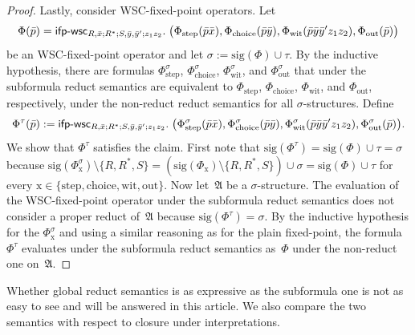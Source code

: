 \documentclass[]{lmcs}
\newcommand{\qspace}{\mathchoice{\;}{\,}{}{}}
\newcommand{\set}[1]{\lbrace #1 \rbrace}
\newcommand{\formA}{\Phi}
\newcommand{\tup}[1]{\bar{#1}}
\newcommand{\StructA}{\mathfrak{A}}
\newcommand{\sigA}{\tau}
\newcommand{\sigB}{\sigma}
\newcommand{\sigOf}[1]{\mathrm{sig}(#1)}
\newcommand{\formOut}{\formA_{\text{out}}}
\newcommand{\formStep}{\formA_{\text{step}}}
\newcommand{\formChoice}{\formA_{\text{choice}}}
\newcommand{\formWit}{\formA_{\text{wit}}}
\newcommand{\ifpwscSym}{\mathsf{ifp}\text{-}\mathsf{wsc}}
\newcommand{\ifpwscbig}[8]{\ifpwscSym_{#1; #2; #3; #4}.\qspace\big(#5,#6,#7, #8\big)}
\begin{document}
\begin{proof}
	Lastly, consider WSC-fixed-point operators. Let
	\[\formA(\tup{p}) = \ifpwscbig{R,\tup{x}}{R^*}{S,\tup{y}, \tup{y}'}{z_1z_2}{\formStep(\tup{p}\tup{x})}{\formChoice(\tup{p}\tup{y})}{\formWit(\tup{p}\tup{y}\tup{y}'z_1z_2)}{\formOut(\tup{p})}\]
	be an WSC-fixed-point operator
	and let $\sigB := \sigOf{\formA} \cup \sigA$.
	By the inductive hypothesis, there are formulas $\formStep^\sigB$, $\formChoice^\sigB$, $\formWit^\sigB$, and $\formOut^\sigB$ that under the subformula reduct semantics are equivalent to $\formStep$, $\formChoice$, $\formWit$, and $\formOut$, respectively, under the non-reduct reduct semantics for all $\sigB$-structures.
	Define 
	\[\formA^\sigA(\tup{p}) := \ifpwscbig{R,\tup{x}}{R^*}{S,\tup{y}, \tup{y}'}{z_1z_2}{\formStep^\sigB(\tup{p}\tup{x})}{\formChoice^\sigB(\tup{p}\tup{y})}{\formWit^\sigB(\tup{p}\tup{y}\tup{y}'z_1z_2)}{\formOut^\sigB(\tup{p})}.\]
	We show that $\formA^\sigA$ satisfies the claim.
	First note that $\sigOf{\formA^\sigA} = \sigOf{\formA} \cup \sigA =\sigB $
	because $\sigOf{\formA_{\text{x}}^\sigB} \setminus \set{R,R^*,S} = (\sigOf{\formA_{\text{x}}} \setminus \set{R,R^*,S} ) \cup \sigB = \sigOf{\formA} \cup \sigA$
	for every $\text{x} \in \set{\text{step},\text{choice},\text{wit},\text{out}}$.
	Now let~$\StructA$ be a $\sigB$-structure.
	The evaluation of the WSC-fixed-point operator under the subformula reduct semantics does not consider a proper reduct of~$\StructA$ because $\sigOf{\formA^\sigA} = \sigB$.
	By the inductive hypothesis for the $\formA_{\text{x}}^\sigB$
	and using a similar reasoning as for the plain fixed-point,
	the formula $\formA^\sigA$ evaluates under the subformula reduct semantics as~$\formA$ under the non-reduct one on~$\StructA$.
\end{proof}
Whether global reduct semantics is as expressive as the subformula one is not as easy to see and will be answered in this article.
We also compare the two semantics with respect to closure under interpretations.
\end{document}
